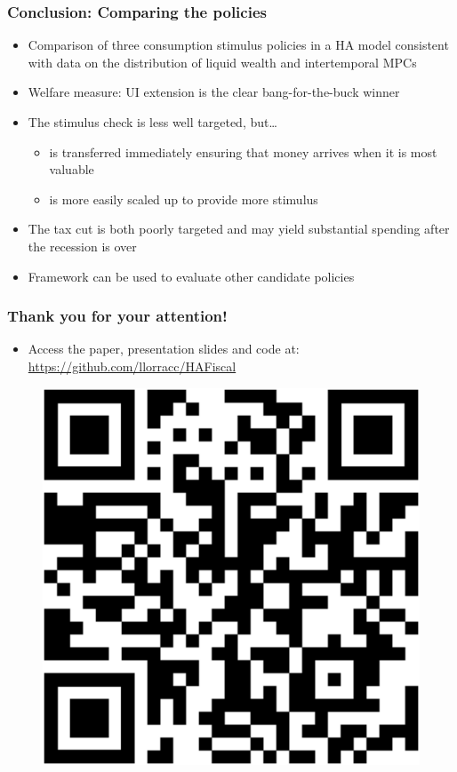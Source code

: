 \documentclass[pdflatex,aspectratio=169, handout]{beamer}
\begin{document}
\begin{frame}
	\frametitle{Conclusion: Comparing the policies}
	\begin{itemize}[<+->]
		\itemsep = .5\bigskipamount 
		\item Comparison of three consumption stimulus policies in a HA model consistent with data on the distribution of liquid wealth and intertemporal MPCs 
		\item Welfare measure: UI extension is the clear bang-for-the-buck winner 
		\item The stimulus check is less well targeted, but\ldots 
		\begin{itemize}[<+->]
			\itemsep = .25\bigskipamount 
			\item is transferred immediately ensuring that money arrives when it is most valuable 
			\item is more easily scaled up to provide more stimulus 
		\end{itemize}
		\item The tax cut is both poorly targeted and may yield substantial spending after the recession is over 
		\item Framework can be used to evaluate other candidate policies 
		
	\end{itemize}
	
\end{frame}



\begin{frame}
	\frametitle{Thank you for your attention!}
	\begin{itemize}[<+->] 
		\item Access the paper, presentation slides and code at: \href{https://github.com/llorracc/HAFiscal}{https://github.com/llorracc/HAFiscal}
	\end{itemize}	

		\begin{figure}
			\centering
			\includegraphics[width=0.3\linewidth]{Presentations/qr-code}
		\end{figure}
	
\end{frame}
\end{document}

